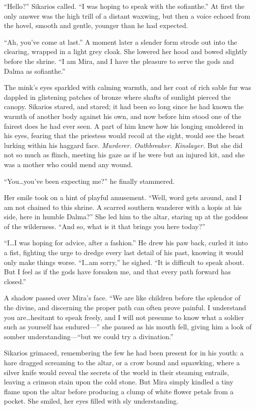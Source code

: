 ``Hello?'' Sikarios called. ``I was hoping to speak with the sofianthe.'' At first the only answer was the high trill of a distant waxwing, but then a voice echoed from the hovel, smooth and gentle, younger than he had expected.

``Ah, you've come at last.'' A moment later a slender form strode out into the clearing, wrapped in a light grey cloak. She lowered her hood and bowed slightly before the shrine. ``I am Mira, and I have the pleasure to serve the gods and Dalma as sofianthe.''

The mink's eyes sparkled with calming warmth, and her coat of rich sable fur was dappled in glistening patches of bronze where shafts of sunlight pierced the canopy. Sikarios stared, and stared; it had been so long since he had known the warmth of another body against his own, and now before him stood one of the fairest does he had ever seen. A part of him knew how his longing smoldered in his eyes, fearing that the priestess would recoil at the sight, would see the beast lurking within his haggard face. \emph{Murderer. Oathbreaker. Kinslayer.} But she did not so much as flinch, meeting his gaze as if he were but an injured kit, and she was a mother who could mend any wound.

``You\ldots{}you've been expecting me?'' he finally stammered.

Her smile took on a hint of playful amusement. ``Well, word gets around, and I am not chained to this shrine. A scarred southern wanderer with a kopis at his side, here in humble Dalma?'' She led him to the altar, staring up at the goddess of the wilderness. ``And so, what is it that brings you here today?''

``I\ldots{}I was hoping for advice, after a fashion.'' He drew his paw back, curled it into a fist, fighting the urge to dredge every last detail of his past, knowing it would only make things worse. ``I\ldots{}am sorry,'' he sighed. ``It is difficult to speak about. But I feel as if the gods have forsaken me, and that every path forward has closed.''

A shadow passed over Mira's face. ``We are like children before the splendor of the divine, and discerning the proper path can often prove painful. I understand you are\ldots{}hesitant to speak freely, and I will not presume to know what a soldier such as yourself has endured---'' she paused as his mouth fell, giving him a look of somber understanding---``but we could try a divination.''

Sikarios grimaced, remembering the few he had been present for in his youth: a hare dragged screaming to the altar, or a crow bound and squawking, where a silver knife would reveal the secrets of the world in their steaming entrails, leaving a crimson stain upon the cold stone. But Mira simply kindled a tiny flame upon the altar before producing a clump of white flower petals from a pocket. She smiled, her eyes filled with sly understanding.

